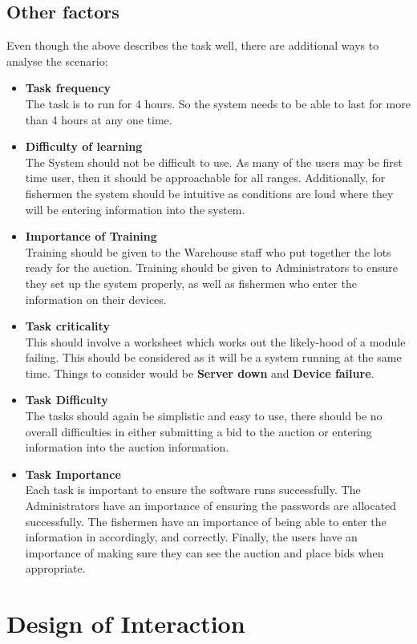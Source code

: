 \documentclass{article}
\begin{document}
\subsection{Other factors}
Even though the above describes the task well, there are additional ways to analyse the scenario:
\begin{itemize}
 \item \textbf{Task frequency}  \\ The task is to run for 4 hours. So the system needs to be able to last for more than 4 hours at any one time. 
 \item \textbf{Difficulty of learning}  \\ The System should not be difficult to use. As many of the users may be first time user, then it should be approachable for all ranges. Additionally, for fishermen the system should be intuitive as conditions are loud where they will be entering information into the system.
\item \textbf{Importance of Training} \\ Training should be given to the Warehouse staff who put together the lots ready for the auction. Training should be given to Administrators to ensure they set up the system properly, as well as fishermen who enter the information on their devices.
\item \textbf{Task criticality}  \\ This should involve a worksheet which works out the likely-hood of a module failing. This should be considered as it will be a system running at the same time. Things to consider would be \textbf{Server down} and \textbf{Device failure}.
\item \textbf{Task Difficulty}  \\ The tasks should again be simplistic and easy to use, there should be no overall difficulties in either submitting a bid to the auction or entering information into the auction information.
\item \textbf{Task Importance}  \\ Each task is important to ensure the software runs successfully. The Administrators have an importance of ensuring the passwords are allocated successfully. The fishermen have an importance of being able to enter the information in accordingly, and correctly. Finally, the users have an importance of making sure they can see the auction and place bids when appropriate.
\end{itemize}
\section{Design of Interaction}
\end{document}
